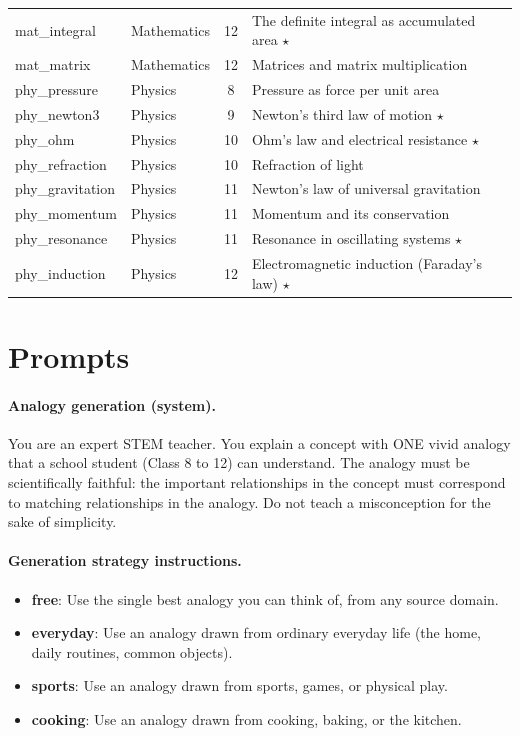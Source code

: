 \begin{center}
\begin{tabular}{llcl}
mat\_integral & Mathematics & 12 & The definite integral as accumulated area $\star$ \\
mat\_matrix & Mathematics & 12 & Matrices and matrix multiplication  \\
phy\_pressure & Physics & 8 & Pressure as force per unit area  \\
phy\_newton3 & Physics & 9 & Newton's third law of motion $\star$ \\
phy\_ohm & Physics & 10 & Ohm's law and electrical resistance $\star$ \\
phy\_refraction & Physics & 10 & Refraction of light  \\
phy\_gravitation & Physics & 11 & Newton's law of universal gravitation  \\
phy\_momentum & Physics & 11 & Momentum and its conservation  \\
phy\_resonance & Physics & 11 & Resonance in oscillating systems $\star$ \\
phy\_induction & Physics & 12 & Electromagnetic induction (Faraday's law) $\star$ \\
\bottomrule
\end{tabular}
\end{center}
\section{Prompts}\label{app:prompts}
\paragraph{Analogy generation (system).} \small\ttfamily You are an expert STEM teacher. You explain a concept with ONE vivid analogy that a school student (Class 8 to 12) can understand. The analogy must be scientifically faithful: the important relationships in the concept must correspond to matching relationships in the analogy. Do not teach a misconception for the sake of simplicity.\normalfont\normalsize
\paragraph{Generation strategy instructions.}\begin{itemize}\setlength\itemsep{0pt}
\item \textbf{free}: Use the single best analogy you can think of, from any source domain.
\item \textbf{everyday}: Use an analogy drawn from ordinary everyday life (the home, daily routines, common objects).
\item \textbf{sports}: Use an analogy drawn from sports, games, or physical play.
\item \textbf{cooking}: Use an analogy drawn from cooking, baking, or the kitchen.
\end{itemize}
